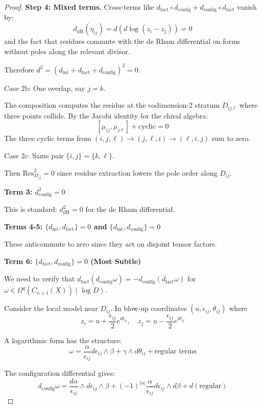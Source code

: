 \begin{proof}
\textbf{Step 4: Mixed terms.}
Cross-terms like $d_{\text{fact}} \circ d_{\text{config}} + d_{\text{config}} \circ d_{\text{fact}}$ vanish by:
\[
d_{\text{dR}}(\eta_{ij}) = d(d\log(z_i - z_j)) = 0
\]
and the fact that residues commute with the de Rham differential on forms without poles along the relevant divisor.

Therefore $d^2 = (d_{\text{int}} + d_{\text{fact}} + d_{\text{config}})^2 = 0$. \qedhere

Case 2b: One overlap, say $j = k$.

The composition computes the residue at the codimension-2 stratum $D_{ij\ell}$ where three points collide. By the Jacobi identity for the chiral algebra:
$$[\mu_{ij}, \mu_{j\ell}] + \text{cyclic} = 0$$
The three cyclic terms from $(i,j,\ell) \to (j,\ell,i) \to (\ell,i,j)$ sum to zero.

Case 2c: Same pair $\{i,j\} = \{k,\ell\}$.

Then $\text{Res}_{D_{ij}}^2 = 0$ since residue extraction lowers the pole order along $D_{ij}$.

\textbf{Term 3: $d_{\text{config}}^2 = 0$}

This is standard: $d_{\text{dR}}^2 = 0$ for the de Rham differential.

\textbf{Terms 4-5: $\{d_{\text{int}}, d_{\text{fact}}\} = 0$ and $\{d_{\text{int}}, d_{\text{config}}\} = 0$}

These anticommute to zero since they act on disjoint tensor factors.

\textbf{Term 6: $\{d_{\text{fact}}, d_{\text{config}}\} = 0$ (Most Subtle)}

We need to verify that $d_{\text{fact}}(d_{\text{config}}\omega) = -d_{\text{config}}(d_{\text{fact}}\omega)$ for $\omega \in \Omega^q(\overline{C}_{n+1}(X))(\log D)$.

Consider the local model near $D_{ij}$. In blow-up coordinates $(u, \epsilon_{ij}, \theta_{ij})$ where 
$$z_i = u + \frac{\epsilon_{ij}}{2}e^{i\theta_{ij}}, \quad z_j = u - \frac{\epsilon_{ij}}{2}e^{i\theta_{ij}}$$

A logarithmic form has the structure:
$$\omega = \frac{\alpha}{\epsilon_{ij}} d\epsilon_{ij} \wedge \beta + \gamma \wedge d\theta_{ij} + \text{regular terms}$$

The configuration differential gives:
$$d_{\text{config}}\omega = \frac{d\alpha}{\epsilon_{ij}} \wedge d\epsilon_{ij} \wedge \beta + (-1)^{|\alpha|}\frac{\alpha}{\epsilon_{ij}} d\epsilon_{ij} \wedge d\beta + d(\text{regular})$$


\end{proof}
